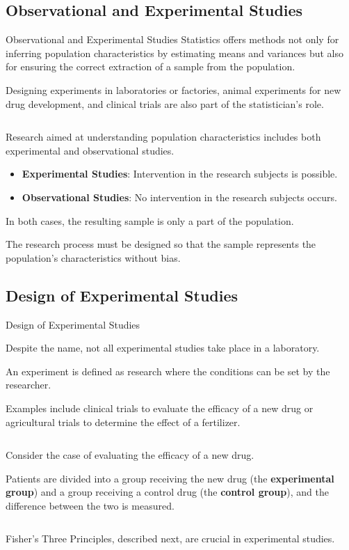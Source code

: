 \documentclass[dvipdfmx, autodetect-engine, aspectratio=169, 10.5pt]{beamer}
\begin{document}
\subsection{Observational and Experimental Studies}

\begin{frame}{Observational and Experimental Studies}
	Statistics offers methods not only for inferring population characteristics by estimating means and variances but also for ensuring the correct extraction of a sample from the population.

	Designing experiments in laboratories or factories, animal experiments for new drug development, and clinical trials are also part of the statistician's role.

	${}$

	Research aimed at understanding population characteristics includes both experimental and observational studies.

	\begin{itemize}
		\item \textbf{Experimental Studies}: Intervention in the research subjects is possible.
		\item \textbf{Observational Studies}: No intervention in the research subjects occurs.
	\end{itemize}

	In both cases, the resulting sample is only a part of the population.

	The research process must be designed so that the sample represents the population's characteristics without bias.

\end{frame}

\subsection{Design of Experimental Studies}

\begin{frame}{Design of Experimental Studies}

	Despite the name, not all experimental studies take place in a laboratory.

	An experiment is defined as research where the conditions can be set by the researcher.

	Examples include clinical trials to evaluate the efficacy of a new drug or agricultural trials to determine the effect of a fertilizer.

	${}$

	Consider the case of evaluating the efficacy of a new drug.

	Patients are divided into a group receiving the new drug (the \textbf{experimental group}) and a group receiving a control drug (the \textbf{control group}), and the difference between the two is measured.

	${}$

	Fisher's Three Principles, described next, are crucial in experimental studies.

\end{frame}
\end{document}
